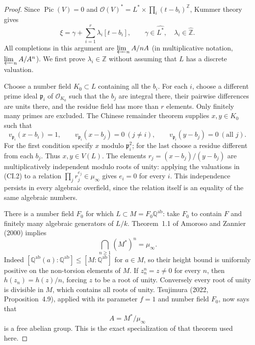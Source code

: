\begin{proof}
Since $\operatorname{Pic}(V)=0$ and
$\mathcal O(V)^*=L^*\times\prod_i(t-b_i)^{\mathbb Z}$, Kummer theory gives
\[
 \xi=\gamma+\sum_{i=1}^r\lambda_i[t-b_i],\qquad
 \gamma\in\widehat{L^*},\quad \lambda_i\in\widehat{\mathbb Z}.
                                                        \tag{CI.1}
\]
All completions in this argument are $\varprojlim_n A/nA$ (in
multiplicative notation, $\varprojlim_n A/A^n$). We first prove
$\lambda_i\in\mathbb Z$ without assuming that $L$ has a discrete
valuation.

Choose a number field $K_0\subset L$ containing all the $b_i$.
For each $i$, choose a different prime ideal $\mathfrak p_i$ of
$\mathcal O_{K_0}$ such that the $b_j$ are integral there, their pairwise
differences are units there, and the residue field has more than $r$
elements. Only finitely many primes are excluded. The Chinese remainder
theorem supplies $x,y\in K_0$ such that
\[
 v_{\mathfrak p_i}(x-b_i)=1,\qquad
 v_{\mathfrak p_i}(x-b_j)=0\ (j\ne i),\qquad
 v_{\mathfrak p_i}(y-b_j)=0\ (\text{all }j).
                                                        \tag{CI.2}
\]
For the first condition specify $x$ modulo $\mathfrak p_i^2$; for the
last choose a residue different from each $b_j$. Thus $x,y\in V(L)$.
The elements $r_j=(x-b_j)/(y-b_j)$ are multiplicatively independent
modulo roots of unity: applying the valuations in (CI.2) to a relation
$\prod_j r_j^{e_j}\in\mu_\infty$ gives $e_i=0$ for every $i$.
This independence persists in every algebraic overfield, since the
relation itself is an equality of the same algebraic numbers.

There is a number field $F_0$ for which $L\subset M=F_0\mathbb
Q^{\mathrm{ab}}$: take $F_0$ to contain $F$ and finitely many algebraic
generators of $L/k$. Theorem~1.1 of Amoroso and Zannier (2000) implies
\[
 \bigcap_{n\ge1}(M^*)^n=\mu_\infty.
                                                        \tag{CI.3}
\]
Indeed $[\mathbb Q^{\mathrm{ab}}(a):\mathbb Q^{\mathrm{ab}}]
\le [M:\mathbb Q^{\mathrm{ab}}]$ for $a\in M$, so their height bound
is uniformly positive on the non-torsion elements of $M$. If
$z_n^n=z\ne0$ for every $n$, then $h(z_n)=h(z)/n$, forcing $z$ to be
a root of unity. Conversely every root of unity is divisible in $M$,
which contains all roots of unity. Tsujimura (2022,
Proposition~4.9), applied with its parameter $f=1$ and number field
$F_0$, now says that
\[
 A=M^*/\mu_\infty
\]
is a free abelian group. This is the exact specialization of that
theorem used here.


\end{proof}
